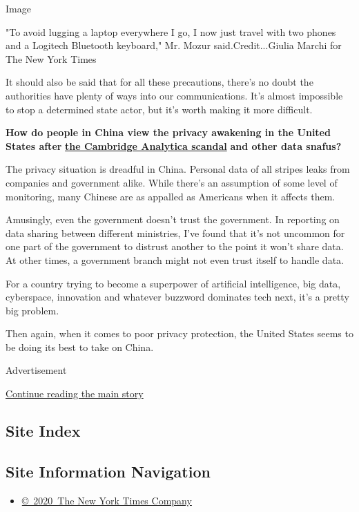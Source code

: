 Image

"To avoid lugging a laptop everywhere I go, I now just travel with two
phones and a Logitech Bluetooth keyboard," Mr. Mozur
said.Credit...Giulia Marchi for The New York Times

It should also be said that for all these precautions, there's no doubt
the authorities have plenty of ways into our communications. It's almost
impossible to stop a determined state actor, but it's worth making it
more difficult.

\textbf{How do people in China view the privacy awakening in the United
States after}
\textbf{\href{https://www.nytimes.com/2018/03/17/us/politics/cambridge-analytica-trump-campaign.html}{the
Cambridge Analytica scandal}} \textbf{and other data snafus?}

The privacy situation is dreadful in China. Personal data of all stripes
leaks from companies and government alike. While there's an assumption
of some level of monitoring, many Chinese are as appalled as Americans
when it affects them.

Amusingly, even the government doesn't trust the government. In
reporting on data sharing between different ministries, I've found that
it's not uncommon for one part of the government to distrust another to
the point it won't share data. At other times, a government branch might
not even trust itself to handle data.

For a country trying to become a superpower of artificial intelligence,
big data, cyberspace, innovation and whatever buzzword dominates tech
next, it's a pretty big problem.

Then again, when it comes to poor privacy protection, the United States
seems to be doing its best to take on China.

Advertisement

\protect\hyperlink{after-bottom}{Continue reading the main story}

\hypertarget{site-index}{%
\subsection{Site Index}\label{site-index}}

\hypertarget{site-information-navigation}{%
\subsection{Site Information
Navigation}\label{site-information-navigation}}

\begin{itemize}
\tightlist
\item
  \href{https://help.nytimes.com/hc/en-us/articles/115014792127-Copyright-notice}{©~2020~The
  New York Times Company}
\end{itemize}

